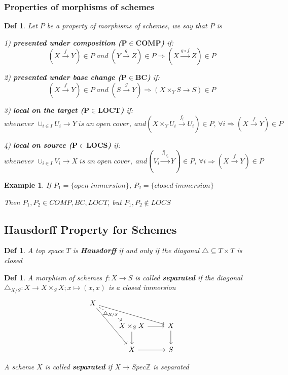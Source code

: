 \documentclass{article}
\newtheorem{definition}[theorem]{Def}
\newtheorem{example}[theorem]{Example}
\begin{document}
\subsubsection{Properties of morphisms of schemes}
\begin{definition}
    Let $P$ be a property of morphisms of schemes, we say that $P$ is 

    1) \textbf{presented under composition ($\bm{P\in COMP}$)} if:
    $$
    (X \xrightarrow {f}Y)\in P\;and\; (Y \xrightarrow {g}Z)\in P \Rightarrow
    (X\xrightarrow{g\circ f}Z)\in P
    $$

    2) \textbf{presented under base change ($\bm{P\in BC}$)} if:
    $$
    (X \xrightarrow {f}Y)\in P
    \;and\; 
    (S \xrightarrow {g}Y) \Rightarrow
    (X\times_Y S\to S)\in P
    $$

    3) \textbf{local on the target ($\bm{P\in LOCT}$)} if:
    $$
    whenever \;\cup_{i\in I}U_i\to Y \; is \; an \; open \;cover,\; and
    (X\times_Y U_i \xrightarrow{f_i} U_i)\in P,\,\forall i
    \Rightarrow
    (X \xrightarrow {f}Y)\in P
    $$

    4) \textbf{local on source ($\bm{P\in LOCS}$)} if:
    $$
    whenever \;\cup_{i\in I}V_i\to X \; is \; an \; open \;cover,\; and
    (V_i\xrightarrow {f|_{V_i}} Y)\in P,\,\forall i
    \Rightarrow
    (X \xrightarrow {f}Y)\in P
    $$
\end{definition}

\begin{example}
    If $P_1=\{open\;immersion\}$, $P_2=\{closed\;immersion\}$
    
    Then $P_1,P_2\in COMP,BC,LOCT$, but
    $P_1,P_2\notin LOCS$
\end{example}





\newpage
\subsection{Hausdorff Property for Schemes}

\begin{definition}
    A top space $T$ is \textbf{Hausdorff} if and only if the diagonal $\triangle \subseteq T \times T$ is closed
\end{definition}

\begin{definition}
    A morphism of schemes $f : X \to S$ is called \textbf{separated} if the diagonal $\triangle_{X/S} : X \to X \times_S X; x \mapsto (x, x)$ is a closed immersion 
    \[\begin{tikzcd}
	X \\
	& { X \times_S X} & X \\
	& X & S
	\arrow[from=2-2, to=3-2]
	\arrow[from=3-2, to=3-3]
	\arrow[from=2-3, to=3-3]
	\arrow[from=2-2, to=2-3]
	\arrow["{\triangle_{X/S}}"{description}, dashed, from=1-1, to=2-2]
	\arrow[from=1-1, to=3-2]
	\arrow[from=1-1, to=2-3]
\end{tikzcd}\]

A scheme $X$ is called \textbf{separated} if $X \to Spec\mathbb Z$ is separated
\end{definition}
\end{document}
